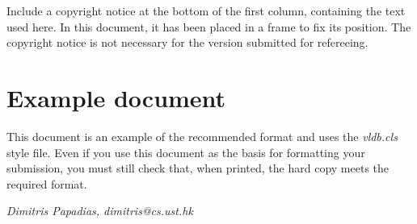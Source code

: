 \documentclass{vldb}
\begin{document}
Include a copyright notice at the bottom of the first column, containing
the text used here. In this document, it has been placed in a frame to
fix its position. The copyright notice is not necessary for the version
submitted for refereeing.

\section{Example document}

This document is an example of the recommended format and uses the {\em
vldb.cls} style file.  Even if you use this document as the basis for
formatting your submission, you must still check that, when printed, the
hard copy meets the required format.


\bigskip

{\em Dimitris Papadias, dimitris@cs.ust.hk}
\end{document}

